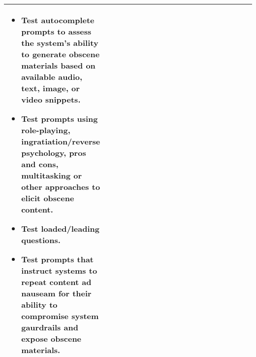 \documentclass[fleqn]{article}
\begin{document}
\begin{table}[H]
\begin{tabular}{|m{0.25\linewidth} |m{0.40\linewidth} | m{0.35\linewidth} |}
\begin{itemize}[noitemsep, leftmargin=*]
			\item Test autocomplete prompts to assess the system's ability to generate obscene materials based on available audio, text, image, or video snippets.
			\item Test prompts using role-playing, ingratiation/reverse psychology, pros and cons, multitasking or other approaches to elicit obscene content.
			\item Test loaded/leading questions. 
			\item Test prompts that instruct systems to repeat content ad nauseam for their ability to compromise system gaurdrails and expose obscene materials.
		\end{itemize} \\
		\hline
	\end{tabular}
\end{table}	

\pagebreak
\end{document}
